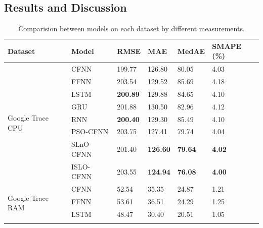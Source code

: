 \documentclass[a4paper,13pt,2p]{report}
\begin{document}
\subsection{Results and Discussion}  
	
\begin{table}[!t]
\caption{Comparision between models on each dataset by different measurements.}
\label{tbl_result_app}
\centering
\begin{tabular}{|l|l|l|l|l|l|}
\hline
Dataset                              & Model     & RMSE            & MAE             & MedAE          & SMAPE (\%)    \\ \hline
\multirow{8}{*}{Google Trace CPU}    & CFNN      & 199.77          & 126.80          & 80.05          & 4.03          \\ \cline{2-6} 
                                     & FFNN      & 203.54          & 129.52          & 85.69          & 4.18          \\ \cline{2-6} 
                                     & LSTM      & \textbf{200.89} & 129.88          & 84.65          & 4.10          \\ \cline{2-6} 
                                     & GRU       & 201.88          & 130.50          & 82.96          & 4.12          \\ \cline{2-6} 
                                     & RNN       & \textbf{200.40} & 129.30          & 85.49          & 4.10          \\ \cline{2-6} 
                                     & PSO-CFNN  & 203.75          & 127.41          & 79.74          & 4.04          \\ \cline{2-6} 
                                     & SLnO-CFNN & 201.40          & \textbf{126.60} & \textbf{79.64} & \textbf{4.02} \\ \cline{2-6} 
                                     & ISLO-CFNN & 203.55          & \textbf{124.94} & \textbf{76.08} & \textbf{4.00} \\ \hline
\multirow{8}{*}{Google Trace RAM}    & CFNN      & 52.54           & 35.35           & 24.87          & 1.21          \\ \cline{2-6} 
                                     & FFNN      & 53.61           & 36.51           & 24.29          & 1.25          \\ \cline{2-6} 
                                     & LSTM      & 48.47           & 30.40           & 20.51          & 1.05          \\ \cline{2-6} 

\end{tabular}
\end{table}
\end{document}
